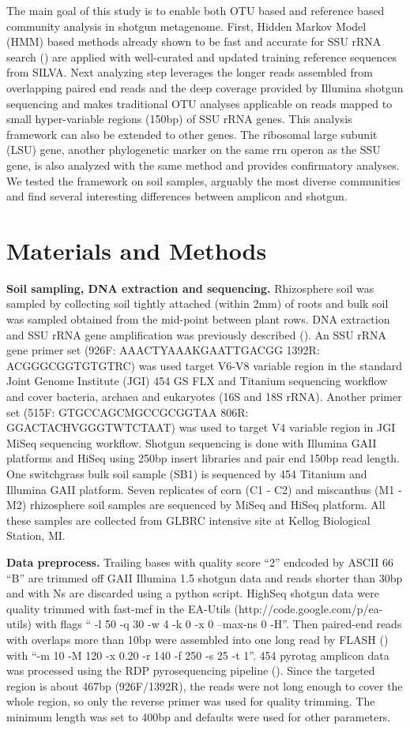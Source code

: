 \documentclass[12pt]{article}
\begin{document}
The main goal of this study is to enable both OTU based and reference
based community analysis in shotgun metagenome. First, Hidden Markov
Model (HMM) based methods already shown to be fast and accurate for
SSU rRNA search (\cite{metarna,rrnaselector,metaxa}) are applied with
well-curated and updated training reference sequences from SILVA. Next
analyzing step leverages the longer reads assembled from overlapping
paired end reads and the deep coverage provided by Illumina shotgun
sequencing and makes traditional OTU analyses applicable on reads
mapped to small hyper-variable regions (150bp) of SSU rRNA genes. This
analysis framework can also be extended to other genes. The ribosomal
large subunit (LSU) gene, another phylogenetic marker on the same rrn
operon as the SSU gene, is also analyzed with the same method and
provides confirmatory analyses. We tested the framework on soil
samples, arguably the most diverse communities and find several
interesting differences between amplicon and shotgun.

\section{Materials and Methods}
  {\bf Soil sampling, DNA extraction and sequencing. }
Rhizosphere soil was sampled by collecting soil tightly attached (within 2mm) of roots and bulk soil was sampled obtained from the mid-point between plant rows. DNA extraction and SSU rRNA gene amplification was previously described (\cite{ed2010}). An SSU rRNA gene primer set (926F: AAACTYAAAKGAATTGACGG 1392R: ACGGGCGGTGTGTRC) was used target V6-V8 variable region in the standard Joint Genome Institute (JGI) 454 GS FLX and Titanium sequencing workflow and cover bacteria, archaea and eukaryotes (16S and 18S rRNA). Another primer set (515F: GTGCCAGCMGCCGCGGTAA 806R: GGACTACHVGGGTWTCTAAT) was used to target V4 variable region in JGI MiSeq sequencing workflow. Shotgun sequencing is done with Illumina GAII platforms and HiSeq using 250bp insert libraries and pair end 150bp read length. One switchgrass bulk soil sample (SB1) is sequenced by 454 Titanium and Illumina GAII platform. Seven replicates of corn (C1 - C2) and miscanthus (M1 - M2) rhizosphere soil samples are sequenced by MiSeq and HiSeq platform. All these samples are collected from GLBRC intensive site at  Kellog Biological Station, MI.

  {\bf Data preprocess. }
Trailing bases with quality score ``2'' endcoded by ASCII 66 ``B'' are trimmed off GAII Illumina 1.5 shotgun data and reads shorter than 30bp and with Ns are discarded using a python script. HighSeq shotgun data were quality trimmed with fast-mcf in the EA-Utils (http://code.google.com/p/ea-utils) with flags `` -l 50 -q 30 -w 4 -k 0 -x 0 --max-ns 0 -H''. Then paired-end reads with overlaps more than 10bp were assembled into one long read by FLASH (\cite{flash2011}) with ``-m 10 -M 120 -x 0.20 -r 140 -f 250 -s 25 -t 1''. 454 pyrotag amplicon data was processed using the RDP pyrosequencing pipeline (\cite{rdp2009}). Since the targeted region is about 467bp (926F/1392R), the reads were not long enough to cover the whole region, so only the reverse primer was used for quality trimming. The minimum length was set to 400bp and defaults were used for other parameters.
\end{document}
